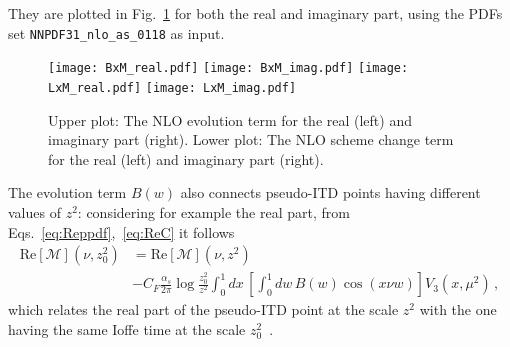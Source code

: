 They are plotted in Fig.~\ref{fig::BL} for both the real and imaginary part, using the PDFs set 
{\tt NNPDF31\_nlo\_as\_0118} as input.
\begin{figure}[h!]
    \center
    \texttt{[image: BxM\_real.pdf]}
    \texttt{[image: BxM\_imag.pdf]}
    \texttt{[image: LxM\_real.pdf]}
    \texttt{[image: LxM\_imag.pdf]}
    \caption{Upper plot: The NLO evolution term for the real (left) and imaginary part (right). 
    Lower plot: The NLO scheme change term for the real (left) and imaginary part (right).}
    \label{fig::BL}
\end{figure}
The evolution term $B\left(w\right)$ also connects pseudo-ITD points having different values of $z^2$: 
considering for example the real part, from Eqs.~\eqref{eq:Reppdf},~\eqref{eq:ReC} it follows
\begin{align}
    \label{eq::evolRe}
        \text{Re}\left[\mathcal{M}\right]\left(\nu, z_0^2\right) &= 
        \text{Re}\left[\mathcal{M}\right]\left(\nu, z^2\right) \nonumber\\ 
        &- C_F \frac{\alpha_s}{2\pi}\log\frac{z_0^2}{z^2} 
		\int_{0}^{1} dx\,\left[\int_0^1 dw \,B\left(w\right)  \cos\left(x\nu w\right)\right] 
		V_3\left(x,\mu^2\right)\,,
\end{align}
which relates the real part of the pseudo-ITD point at the scale $z^2$ with the one
having the same Ioffe time at the scale $z_0^2$~\cite{Orginos:2017kos,Karpie:2017bzm}. 

